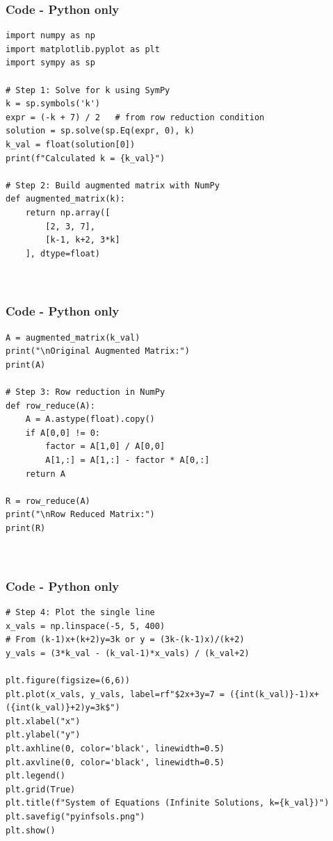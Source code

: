 \documentclass{beamer}
\theoremstyle{remark}
\numberwithin{equation}{section}
\begin{document}
\begin{frame}[fragile]
\frametitle{Code - Python only}
\begin{lstlisting}
import numpy as np
import matplotlib.pyplot as plt
import sympy as sp

# Step 1: Solve for k using SymPy
k = sp.symbols('k')
expr = (-k + 7) / 2   # from row reduction condition
solution = sp.solve(sp.Eq(expr, 0), k)
k_val = float(solution[0])
print(f"Calculated k = {k_val}")

# Step 2: Build augmented matrix with NumPy
def augmented_matrix(k):
    return np.array([
        [2, 3, 7],
        [k-1, k+2, 3*k]
    ], dtype=float)



\end{lstlisting}
\end{frame}

\begin{frame}[fragile]
\frametitle{Code - Python only}
\begin{lstlisting}
A = augmented_matrix(k_val)
print("\nOriginal Augmented Matrix:")
print(A)

# Step 3: Row reduction in NumPy
def row_reduce(A):
    A = A.astype(float).copy()
    if A[0,0] != 0:
        factor = A[1,0] / A[0,0]
        A[1,:] = A[1,:] - factor * A[0,:]
    return A

R = row_reduce(A)
print("\nRow Reduced Matrix:")
print(R)



\end{lstlisting}
\end{frame}

\begin{frame}[fragile]
\frametitle{Code - Python only}
\begin{lstlisting}
# Step 4: Plot the single line
x_vals = np.linspace(-5, 5, 400)
# From (k-1)x+(k+2)y=3k or y = (3k-(k-1)x)/(k+2)
y_vals = (3*k_val - (k_val-1)*x_vals) / (k_val+2)

plt.figure(figsize=(6,6))
plt.plot(x_vals, y_vals, label=rf"$2x+3y=7 = ({int(k_val)}-1)x+({int(k_val)}+2)y=3k$")
plt.xlabel("x")
plt.ylabel("y")
plt.axhline(0, color='black', linewidth=0.5)
plt.axvline(0, color='black', linewidth=0.5)
plt.legend()
plt.grid(True)
plt.title(f"System of Equations (Infinite Solutions, k={k_val})")
plt.savefig("pyinfsols.png")
plt.show()


\end{lstlisting}
\end{frame}
\end{document}
